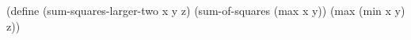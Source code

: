 \begtt{}
(define (sum-squares-larger-two x y z)
   (sum-of-squares (max x y))
                   (max (min x y) z))
\endtt
